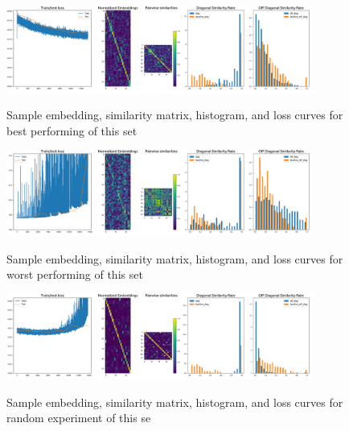 \documentclass[a4paper]{article}
\begin{document}
\begin{figure}[H]
  \includegraphics[width=0.9\textwidth]{figures/pairwise3-spattn0-0-0}
  \label{fig:pairwise3-spattn0-0-0-sub1}
  \caption{Sample embedding, similarity matrix, histogram, and loss curves for best performing of this set}
\end{figure}
\begin{figure}[H]
  \includegraphics[width=0.9\textwidth]{figures/pairwise5-attn0-0-0}
  \label{fig:pairwise5-attn0-0-0-sub1}
  \caption{Sample embedding, similarity matrix, histogram, and loss curves for worst performing of this set}
\end{figure}
\begin{figure}[H]
  \includegraphics[width=0.9\textwidth]{figures/pairwise3-spattn1-0-1}
  \label{fig:pairwise3-spattn1-0-1-sub1}
  \caption{Sample embedding, similarity matrix, histogram, and loss curves for random experiment of this se}
\end{figure}
\end{document}
